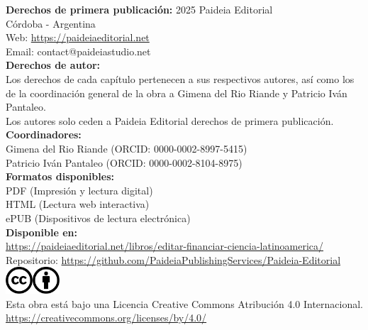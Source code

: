 \noindent\textbf{Derechos de primera publicación:} 2025 \quad Paideia Editorial\\
Córdoba - Argentina\\
Web: \url{https://paideiaeditorial.net}\\
Email: contact@paideiastudio.net\\[1em]

\noindent\textbf{Derechos de autor:}\\
Los derechos de cada capítulo pertenecen a sus respectivos autores, así como los de la coordinación general de la obra a Gimena del Rio Riande y Patricio Iván Pantaleo.\\
Los autores solo ceden a Paideia Editorial derechos de primera publicación.\\[1em]

\noindent\textbf{Coordinadores:}\\
Gimena del Rio Riande (ORCID: 0000-0002-8997-5415)\\
Patricio Iván Pantaleo (ORCID: 0000-0002-8104-8975)\\[1em]

\noindent\textbf{Formatos disponibles:}\\
PDF (Impresión y lectura digital)\\
HTML (Lectura web interactiva)\\
ePUB (Dispositivos de lectura electrónica)\\[1em]

\noindent\textbf{Disponible en:}\\
\url{https://paideiaeditorial.net/libros/editar-financiar-ciencia-latinoamerica/}\\
Repositorio: \url{https://github.com/PaideiaPublishingServices/Paideia-Editorial}\\[1em]

\noindent\includegraphics[height=1cm]{cc.png}\hspace{0.2cm}\includegraphics[height=1cm]{by.png}
\\[0.5em]
Esta obra está bajo una Licencia Creative Commons Atribución 4.0 Internacional.\\
\url{https://creativecommons.org/licenses/by/4.0/}\\[1em]

